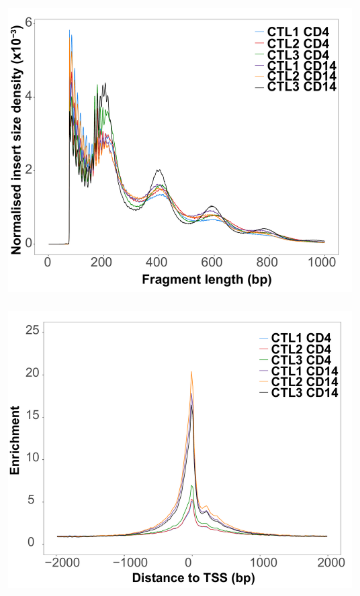 \begin{figure}[htbp]
\centering
\begin{subfigure}[b]{0.45\textwidth}
\centering
\includegraphics[width=\textwidth]{./Results1/pdfs/ATAC_Core_fresh_CD4_CD14_frag_size_distribution}
\caption{\textbf{}}
\end{subfigure}%
\begin{subfigure}[b]{0.45\textwidth}
\centering
\includegraphics[width=\textwidth]{./Results1/pdfs/TSS_enrichment_Core_fresh_CD4_CD14}
\caption{\textbf{}}
\end{subfigure}

\end{figure}
